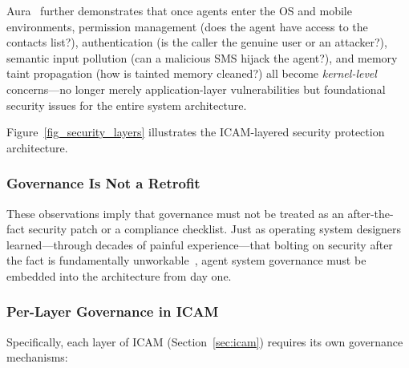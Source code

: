 \documentclass[11pt,a4paper]{article}
\begin{document}
Aura~\cite{aura2025} further demonstrates that once agents enter the OS and mobile environments, permission management (does the agent have access to the contacts list?), authentication (is the caller the genuine user or an attacker?), semantic input pollution (can a malicious SMS hijack the agent?), and memory taint propagation (how is tainted memory cleaned?) all become \emph{kernel-level} concerns---no longer merely application-layer vulnerabilities but foundational security issues for the entire system architecture.

Figure~\ref{fig_security_layers} illustrates the ICAM-layered security protection architecture.


\subsubsection{Governance Is Not a Retrofit}
These observations imply that governance must not be treated as an after-the-fact security patch or a compliance checklist.
Just as operating system designers learned---through decades of painful experience---that bolting on security after the fact is fundamentally unworkable~\cite{ostep_2023}, agent system governance must be embedded into the architecture from day one.

\subsubsection{Per-Layer Governance in ICAM}
Specifically, each layer of ICAM (Section~\ref{sec:icam}) requires its own governance mechanisms:
\end{document}

